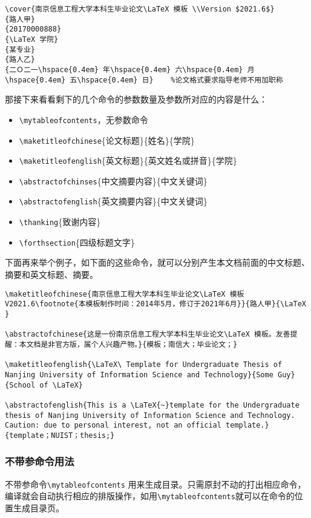 {\color{green!50!black}
\begin{lstlisting}[breaklines=true,]
\cover{南京信息工程大学本科生毕业论文\LaTeX 模板 \\Version $2021.6$}
{路人甲}
{20170000888}
{\LaTeX 学院}
{某专业}
{路人乙}
{二Ｏ二一\hspace{0.4em} 年\hspace{0.4em} 六\hspace{0.4em} 月\hspace{0.4em} 五\hspace{0.4em} 日}    %论文格式要求指导老师不用加职称
\end{lstlisting}
}
那接下来看看剩下的几个命令的参数数量及参数所对应的内容是什么：
{\color{blue}
\begin{itemize}
\item \verb|\mytableofcontents|，无参数命令
\item \verb|\maketitleofchinese|\{论文标题\}\{姓名\}\{学院\}
\item \verb|\maketitleofenglish|\{英文标题\}\{英文姓名或拼音\}\{学院\}
\item \verb|\abstractofchinses|\{中文摘要内容\}\{中文关键词\}
\item \verb|\abstractofenglish|\{英文摘要内容\}\{中文关键词\}
\item \verb|\thanking|\{致谢内容\}
\item \verb|\forthsection|\{四级标题文字\}
\end{itemize}
}
下面再来举个例子，如下面的这些命令，就可以分别产生本文档前面的中文标题、摘要和英文标题、摘要。

{\color{green!50!black}
\begin{lstlisting}[breaklines=true,]
\maketitleofchinese{南京信息工程大学本科生毕业论文\LaTeX 模板V2021.6\footnote{本模板制作时间：2014年5月，修订于2021年6月}}{路人甲}{\LaTeX }

\abstractofchinese{这是一份南京信息工程大学本科生毕业论文\LaTeX 模板。友善提醒：本文档是非官方版，属个人兴趣产物。}{模板；南信大；毕业论文；}
    
\maketitleofenglish{\LaTeX\ Template for Undergraduate Thesis of Nanjing University of Information Science and Technology}{Some Guy}{School of \LaTeX}
    
\abstractofenglish{This is a \LaTeX{~}template for the Undergraduate thesis of Nanjing University of Information Science and Technology. Caution: due to personal interest, not an official template.}{template；NUIST；thesis;}
\end{lstlisting}
}

\subsubsection{不带参命令用法}
不带参命令\verb|\mytableofcontents| 用来生成目录。只需原封不动的打出相应命令，编译就会自动执行相应的排版操作，如用\verb|\mytableofcontents|就可以在命令的位置生成目录页。